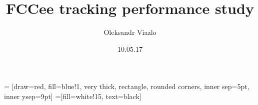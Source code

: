 \documentclass[8pt]{beamer}
\newif\ifplacelogo %
\begin{document}
\newcommand{\yRefPosOne}{0.0}
\newcommand{\xRefPosOne}{0.0}
\newcommand{\yRefPosTwo}{0.0}
\newcommand{\xRefPosTwo}{0.0}
\newcommand{\yRefIncrementOne}{0.0}
\newcommand{\xRefIncrementOne}{0.0}
\newcommand{\yRefIncrementTwo}{0.0}
\newcommand{\xRefIncrementTwo}{0.0}

\graphicspath{{/afs/cern.ch/work/v/viazlo/analysis/trackingPerformance/perfPlots_vsMaterialBudget/}}



\title[FCCee tracking performance \hspace{17em}\insertframenumber/
\inserttotalframenumber]{FCCee tracking performance study}


	\author{Oleksandr Viazlo}
	\date{10.05.17\\}

\placelogofalse

\newcommand{\channel}{enuqqbb}
\newcommand{\goodChannel}{$t\bar{t} \longrightarrow W^{+}bW^{-}\bar{b} \longrightarrow q\bar{q}be^{-}\bar{\nu_{e}}\bar{b} + e^{+}\nu_{e}bq\bar{q}\bar{b}$}
\newcommand{\myNodeOne}{\tikz[baseline,inner sep=1pt] \node[anchor=base]}
\newcommand{\myNodeTwo}{\tikz[baseline,inner sep=1pt] \node[anchor=base]}

 = [draw=red, fill=blue!1, very thick,
    rectangle, rounded corners, inner sep=5pt, inner ysep=9pt]
 =[fill=white!15, text=black]
\end{document}
